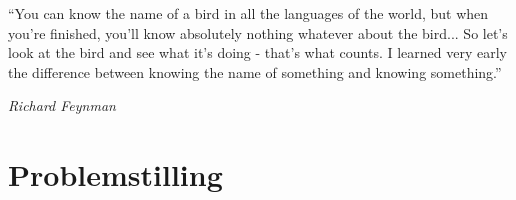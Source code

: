 \documentclass[main.tex]{subfiles}
\begin{document}
\setlength{\epigraphwidth}{0.8\textwidth}
\epigraph{``You can know the name of a bird in all the languages of the world, 
but when you're finished, you'll know absolutely nothing whatever about the bird...
So let's look at the bird and see what it’s doing - that's what counts. I learned 
very early the difference between knowing the name of something and knowing something.''}
{\textit{Richard Feynman}}

\section*{Problemstilling}
\end{document}

